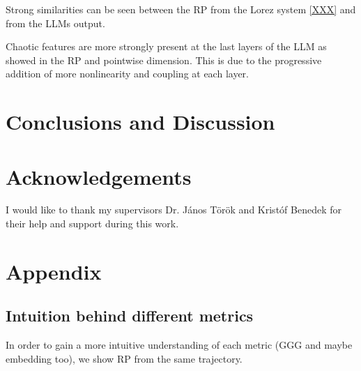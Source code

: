 \documentclass[a4paper,12pt]{article}
\begin{document}
Strong similarities can be seen between the RP from the Lorez system \ref{XXX} and from the LLMs output.

Chaotic features are more strongly present at the last layers of the LLM as showed in the RP and pointwise dimension. This is due to the progressive addition of more nonlinearity and coupling at each layer. 


\section{Conclusions and Discussion}




\section{Acknowledgements }

I would like to thank my supervisors Dr. János Török and Kristóf Benedek for their help and support during this work.

\newpage



\section{Appendix }

\subsection{Intuition behind different metrics}

In order to gain a more intuitive understanding of each metric (GGG and maybe embedding too), we show RP from the same trajectory.

\end{document}
